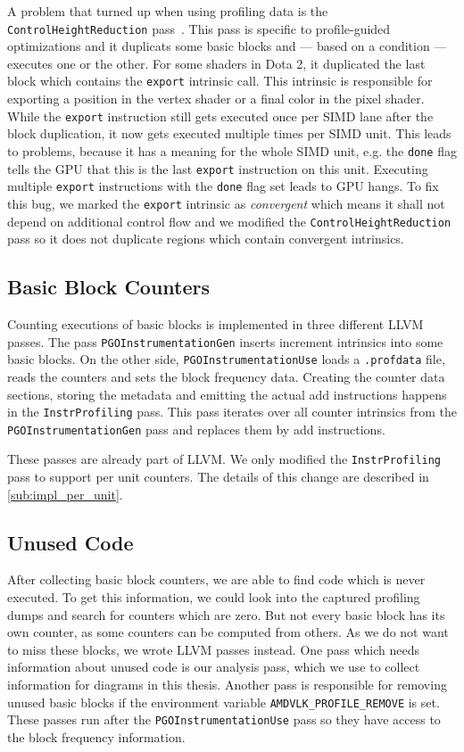 A problem that turned up when using profiling data is the \texttt{ControlHeightReduction} pass~\cite{ControlHeightReduction}.
This pass is specific to profile-guided optimizations and it duplicats some basic blocks and --- based on a condition --- executes one or the other.
For some shaders in Dota 2, it duplicated the last block which contains the \texttt{export} intrinsic call.
This intrinsic is responsible for exporting a position in the vertex shader or a final color in the pixel shader.
While the \texttt{export} instruction still gets executed once per SIMD lane after the block duplication, it now gets executed multiple times per SIMD unit.
This leads to problems, because it has a meaning for the whole SIMD unit, e.g. the \texttt{done} flag tells the GPU that this is the last \texttt{export} instruction on this unit.
Executing multiple \texttt{export} instructions with the \texttt{done} flag set leads to GPU hangs.
To fix this bug, we marked the \texttt{export} intrinsic as \emph{convergent} which means it shall not depend on additional control flow and we modified the \texttt{ControlHeightReduction} pass so it does not duplicate regions which contain convergent intrinsics.

\subsection{Basic Block Counters}
\label{sub:bbcounters}
Counting executions of basic blocks is implemented in three different LLVM passes.
The pass \texttt{PGOInstrumentationGen} inserts increment intrinsics into some basic blocks.
On the other side, \texttt{PGOInstrumentationUse} loads a \texttt{.profdata} file, reads the counters and sets the block frequency data.
Creating the counter data sections, storing the metadata and emitting the actual add instructions happens in the \texttt{InstrProfiling} pass.
This pass iterates over all counter intrinsics from the \texttt{PGOInstrumentationGen} pass and replaces them by add instructions.

These passes are already part of LLVM. We only modified the \texttt{InstrProfiling} pass to support per unit counters.
The details of this change are described in \cref{sub:impl_per_unit}.

\subsection{Unused Code}
\label{sub:impl_unused_code}
After collecting basic block counters, we are able to find code which is never executed.
To get this information, we could look into the captured profiling dumps and search for counters which are zero. But not every basic block has its own counter, as some counters can be computed from others.
As we do not want to miss these blocks, we wrote LLVM passes instead.
One pass which needs information about unused code is our analysis pass, which we use to collect information for diagrams in this thesis.
Another pass is responsible for removing unused basic blocks if the environment variable \texttt{AMDVLK\_PROFILE\_REMOVE} is set.
These passes run after the \texttt{PGOInstrumentationUse} pass so they have access to the block frequency information.

